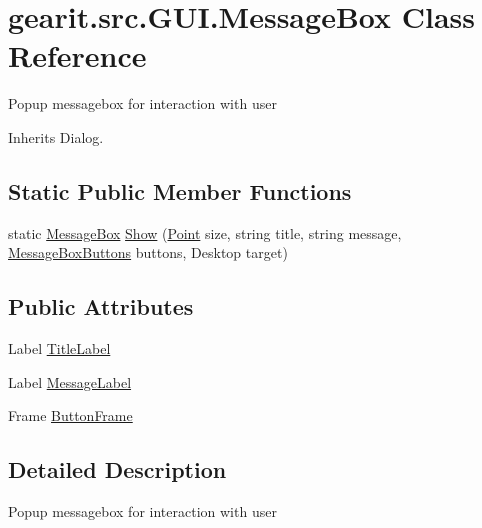 \hypertarget{classgearit_1_1src_1_1_g_u_i_1_1_message_box}{\section{gearit.\+src.\+G\+U\+I.\+Message\+Box Class Reference}
\label{classgearit_1_1src_1_1_g_u_i_1_1_message_box}
}


Popup messagebox for interaction with user  




Inherits Dialog.

\subsection*{Static Public Member Functions}
\begin{DoxyCompactItemize}
\item 
static \hyperlink{classgearit_1_1src_1_1_g_u_i_1_1_message_box}{Message\+Box} \hyperlink{classgearit_1_1src_1_1_g_u_i_1_1_message_box_a67b634eed3bc971b2272549661e3a616}{Show} (\hyperlink{_seidel_decomposer_8cs_a2a603daa342d957bd27dd0b1eb38af15}{Point} size, string title, string message, \hyperlink{namespacegearit_1_1src_1_1_g_u_i_a142175becd6241f1b8c959354f0df291}{Message\+Box\+Buttons} buttons, Desktop target)
\end{DoxyCompactItemize}
\subsection*{Public Attributes}
\begin{DoxyCompactItemize}
\item 
Label \hyperlink{classgearit_1_1src_1_1_g_u_i_1_1_message_box_a427aa0e453d98cf59ffabad81d61bda8}{Title\+Label}
\item 
Label \hyperlink{classgearit_1_1src_1_1_g_u_i_1_1_message_box_a7499a39d800473f8d2fb2a4c60c602c4}{Message\+Label}
\item 
Frame \hyperlink{classgearit_1_1src_1_1_g_u_i_1_1_message_box_aa0a2cb0628b65f402993fc8d95136758}{Button\+Frame}
\end{DoxyCompactItemize}


\subsection{Detailed Description}
Popup messagebox for interaction with user 



